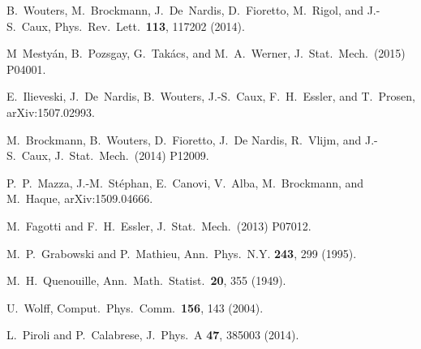 \documentclass[11pt]{iopart}
\begin{document}
\begin{thebibliography}{99}
B.~Wouters, M.~Brockmann, J.~De~Nardis, D.~Fioretto, M.~Rigol, and J.-S.~Caux, 
Phys.\ Rev.\ Lett.\ {\bf 113}, 117202 (2014). 

M~Mesty\'an, B.~Pozsgay, G.~Tak\'acs, and M.~A.~Werner, J.\ Stat.\ Mech.\ (2015) 
P04001.

E.~Ilieveski, J.~De~Nardis, B.~Wouters, J.-S.~Caux, F.~H.~Essler, and T.~Prosen, 
arXiv:1507.02993. 

M.~Brockmann, B.~Wouters, D.~Fioretto, J.~De Nardis, R.~Vlijm, and J.-S.~Caux, 
J.\ Stat.\ Mech.\ (2014) P12009. 

P.~P.~Mazza, J.-M.~St\'ephan, E.~Canovi, V.~Alba, M.~Brockmann, and M.~Haque, 
arXiv:1509.04666.

M.~Fagotti and F.~H.~Essler, J.\ Stat.\ Mech.\ (2013) P07012. 

M.~P.~Grabowski and P.~Mathieu, Ann.\ Phys.\ N.Y. {\bf 243},
299 (1995).

M.~H.~Quenouille, Ann.\ Math.\ Statist.\ {\bf 20}, 355 (1949).

U.~Wolff, Comput.\ Phys.\ Comm.\ {\bf 156}, 143 (2004). 

L.~Piroli and P.~Calabrese, J.\ Phys.\ A {\bf 47}, 385003 (2014). 

\end{thebibliography}
\end{document}
